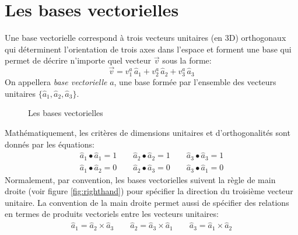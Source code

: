 \section{Les bases vectorielles}
\label{vectorbasis}
Une base vectorielle correspond à trois vecteurs unitaires (en 3D) orthogonaux qui déterminent l'orientation de trois axes dans l'espace et forment une base qui permet de décrire n'importe quel vecteur $\vec{v}$ sous la forme:
\begin{equation}
\vec{v} = v_1^a \, \hat{a}_{1} + v_2^a \, \hat{a}_{2} + v_3^a \, \hat{a}_{3}
\label{eq:vecbasis}
\end{equation} 
On appellera \textit{base vectorielle} $a$, une base formée par l'ensemble des vecteurs unitaires $\{\hat{a}_{1},\hat{a}_{2},\hat{a}_{3}\}$.
%
\begin{figure}[htpb]
        \centering
				\hspace{10pt}
				\hspace{10pt}
        \caption{Les bases vectorielles}
				\label{fig:vecbasis}
\end{figure}

Mathématiquement, les critères de dimensions unitaires et d'orthogonalités sont donnés par les équations:
\begin{align}
\hat{a}_{1} \bullet \hat{a}_{1} = 1 \quad\quad \hat{a}_{2} \bullet \hat{a}_{2} = 1 \quad\quad \hat{a}_{3} \bullet \hat{a}_{3} = 1 
\label{eq:unit} \\
\hat{a}_{1} \bullet \hat{a}_{2} = 0 \quad\quad \hat{a}_{2} \bullet \hat{a}_{3} = 0 \quad\quad \hat{a}_{3} \bullet \hat{a}_{1} = 0
\label{eq:ortho}
\end{align} 
Normalement, par convention, les bases vectorielles suivent la règle de main droite (voir figure \ref{fig:righthand}) pour spécifier la direction du troisième vecteur unitaire. La convention de la main droite permet aussi de spécifier des relations en termes de produits vectoriels entre les vecteurs unitaires:
\begin{align}
\hat{a}_{1} = \hat{a}_{2} \times \hat{a}_{3} \quad\quad \hat{a}_{2} = \hat{a}_{3} \times \hat{a}_{1} \quad\quad \hat{a}_{3} = \hat{a}_{1} \times \hat{a}_{2} 
\label{eq:righthand}
\end{align} 


